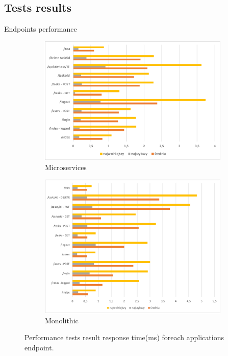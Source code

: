 \documentclass{beamer}
\begin{document}
	\subsection{Tests results}
	\begin{frame}{Endpoints performance}
		\begin{figure}[h!]
  			\centering
  			\begin{subfigure}[b]{0.45\linewidth}
    			\includegraphics[width=\linewidth]{pictures/mono-zad}
    			\caption{Microservices}
  			\end{subfigure}
  			\begin{subfigure}[b]{0.45\linewidth}
    			\includegraphics[width=\linewidth]{pictures/micro-zad}
    			\caption{Monolithic}
  			\end{subfigure}
  				\caption{Performance tests result response time(ms) foreach applications endpoint.}
  				\label{fig:coffee}
		\end{figure}
	\end{frame}
	
\end{document}
